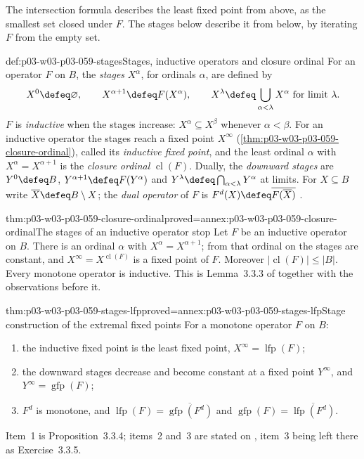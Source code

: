 The intersection formula describes the least fixed point from above, as the
smallest set closed under \(F\). The stages below describe it from below,
by iterating \(F\) from the empty set.

\begin{hbdefinition}{def:p03-w03-p03-059-stages}{Stages, inductive operators and closure ordinal}
For an operator \(F\) on \(B\), the \emph{stages} \(X^\alpha\), for
ordinals \(\alpha\), are defined by
\[
 X^0\defeq\varnothing,\qquad X^{\alpha+1}\defeq F(X^\alpha),\qquad
 X^\lambda\defeq\bigcup_{\alpha<\lambda}X^\alpha\ \text{for limit }\lambda.
\]
\(F\) is \emph{inductive} when the stages increase:
\(X^\alpha\subseteq X^\beta\) whenever \(\alpha<\beta\). For an inductive
operator the stages reach a fixed point
\(X^\infty\) (\cref{thm:p03-w03-p03-059-closure-ordinal}), called its
\emph{inductive fixed point}, and the least ordinal \(\alpha\) with
\(X^\alpha=X^{\alpha+1}\) is the \emph{closure ordinal}
\(\operatorname{cl}(F)\). Dually, the \emph{downward stages} are
\(Y^0\defeq B\), \(Y^{\alpha+1}\defeq F(Y^\alpha)\) and
\(Y^\lambda\defeq\bigcap_{\alpha<\lambda}Y^\alpha\) at limits. For
\(X\subseteq B\) write \(\overline X\defeq B\setminus X\); the \emph{dual
operator} of \(F\) is \(F^d(X)\defeq\overline{F(\overline X)}\)
\cite[p.~154]{Gradel2007FMTDescriptiveChapter}.
\end{hbdefinition}

\begin{hblemma}{thm:p03-w03-p03-059-closure-ordinal}{proved=annex:p03-w03-p03-059-closure-ordinal}{The stages of an inductive operator stop}
Let \(F\) be an inductive operator on \(B\). There is an ordinal
\(\alpha\) with \(X^\alpha=X^{\alpha+1}\); from that ordinal on the stages
are constant, and \(X^\infty=X^{\operatorname{cl}(F)}\) is a fixed point
of \(F\). Moreover \(|\operatorname{cl}(F)|\leq|B|\). Every monotone
operator is inductive. This is Lemma~3.3.3 of
\cite[p.~154]{Gradel2007FMTDescriptiveChapter} together with the observations before it.
\end{hblemma}

\begin{hbtheorem}{thm:p03-w03-p03-059-stages-lfp}{proved=annex:p03-w03-p03-059-stages-lfp}{Stage construction of the extremal fixed points}
For a monotone operator \(F\) on \(B\):
\begin{enumerate}
 \item the inductive fixed point is the least fixed point,
       \(X^\infty=\operatorname{lfp}(F)\);
 \item the downward stages decrease and become constant at a fixed point
       \(Y^\infty\), and \(Y^\infty=\operatorname{gfp}(F)\);
 \item \(F^d\) is monotone, and
       \(\operatorname{lfp}(F)=\overline{\operatorname{gfp}(F^d)}\) and
       \(\operatorname{gfp}(F)=\overline{\operatorname{lfp}(F^d)}\).
\end{enumerate}
Item~1 is Proposition~3.3.4; items~2 and~3 are stated on
\cite[p.~154]{Gradel2007FMTDescriptiveChapter}, item~3 being left there as
Exercise~3.3.5.
\end{hbtheorem}

